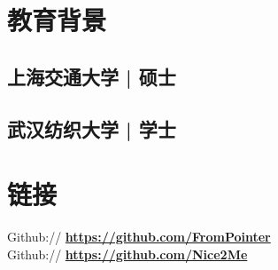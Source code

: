 \documentclass[]{deedy-resume-document-class}
\begin{document}
\begin{minipage}[t]{0.33\textwidth} 


\section{教育背景} 
\subsection{上海交通大学  |  硕士}
\sectionsep

\subsection{武汉纺织大学  |  学士}
\sectionsep


\section{链接} 
Github:// \href{https://github.com/FromPointer}{\bf https://github.com/FromPointer} \\
Github:// \href{https://github.com/Nice2Me}{\bf https://github.com/Nice2Me} \\
\sectionsep



\end{minipage}
\end{document}
